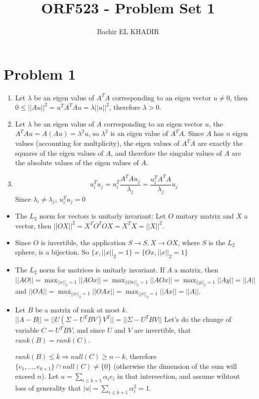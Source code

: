 \documentclass[12pt]{article}
\title{ORF523 - Problem Set 1}
\author{Bachir EL KHADIR }
\newenvironment{problem}[1]
{\section*{Problem #1}}{}
\begin{document}
\maketitle



\begin{problem}{1}

  \begin{enumerate}
  \item Let $\lambda$ be an eigen value of $A^TA$ corresponding to an eigen vector $u \ne 0$, then $0 \le ||Au||^2 = u^TA^TAu = \lambda ||u||^2$, therefore $\lambda > 0$.
  \item Let $\lambda$ be an eigen value of $A$ corresponding to an eigen vector $u$, the $A^TAu = A(Au) = \lambda^2 u$, so $\lambda^2$ is an eigen value of $A^TA$. Since $A$ has $n$ eigen values (accounting for multplicity), the eigen values of $A^TA$ are exactly the squares of the eigen values of $A$, and therefore the singular values of $A$ are the absolute values of the eigen values of $A$.

  \item
    $$u_i^Tu_j = u_i^T\frac{A^TAu_j}{\lambda_j} = \frac{u_i^TA^TA}{\lambda_j}u_j$$
    Since $\lambda_i \ne \lambda_j$, $u_i^Tu_j = 0$
  \end{enumerate}

  

  \begin{itemize}
  \item The $L_2$ norm for vectors is unitarly invariant:
    Let $O$ unitary matrix and $X$ a vector, then $||OX||^2  = X^TO^TOX = X^TX = ||X||^2$.
  \item Since $O$ is invertible, the application $S \rightarrow S, X \rightarrow OX$, where $S$ is the $L_2$ sphere, is a bijection. So   $\{ x, ||x||_2 = 1\} = \{ Ox, ||x||_2 = 1\}$
  \item The $L_2$ norm for matrices is unitarly invariant.
    If $A$ a matrix, then $||AO|| = \max_{||x||_2 = 1} ||AOx|| = \max_{||Ox||_2 = 1} ||AOx|| = \max_{||y||_2 = 1} ||Ay|| = ||A||$ and
    $||OA|| = \max_{||x||_2 = 1} ||OAx|| = \max_{||x||_2 = 1} ||Ax|| = ||A||$.
  \item
    Let $B$ be a matrix of rank at most $k$.
    $||A - B|| = ||U(\Sigma - U^TBV)V^T|| = ||\Sigma - U^TBV||$
    Let's do the change of variable $C = U^TBV$, and since $U$ and $V$ are invertible,  that $rank(B) = rank(C)$.

    
    $rank(B)  \le k \Rightarrow null(C) \ge n - k$, therefore $\{ e_1, \ldots, e_{k+1} \} \cap null(C) \ne \{ 0 \}$ (otherwise the dimension of the sum will exceed $n$).
    Let $u = \sum_{i \le k+1} \alpha_i e_i$ in that intersection, and assume wihtout loss of generality that $|u| = \sum_{i \le k+1} \alpha_i^2 = 1$. 


\end{itemize}
\end{problem}
\end{document}
